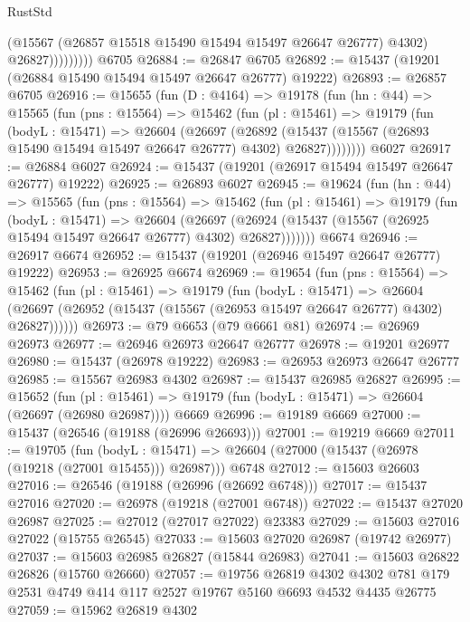 \begin{lexlean}{RustStd}
\begin{coremodule}
                      (@15567 (@26857 @15518 @15490 @15494 @15497 @26647 @26777) @4302)
                      @26827)))))))))
    @6705
@26884 := @26847 @6705
@26892 := @15437 (@19201 (@26884 @15490 @15494 @15497 @26647 @26777) @19222)
@26893 := @26857 @6705
@26916 := @15655
    (fun (D : @4164) =>
    @19178
      (fun (hn : @44) =>
      @15565
        (fun (pns : @15564) =>
        @15462
          (fun (pl : @15461) =>
          @19179
            (fun (bodyL : @15471) =>
            @26604
              (@26697
                (@26892
                  (@15437 (@15567 (@26893 @15490 @15494 @15497 @26647 @26777) @4302) @26827))))))))
    @6027
@26917 := @26884 @6027
@26924 := @15437 (@19201 (@26917 @15494 @15497 @26647 @26777) @19222)
@26925 := @26893 @6027
@26945 := @19624
    (fun (hn : @44) =>
    @15565
      (fun (pns : @15564) =>
      @15462
        (fun (pl : @15461) =>
        @19179
          (fun (bodyL : @15471) =>
          @26604
            (@26697
              (@26924 (@15437 (@15567 (@26925 @15494 @15497 @26647 @26777) @4302) @26827)))))))
    @6674
@26946 := @26917 @6674
@26952 := @15437 (@19201 (@26946 @15497 @26647 @26777) @19222)
@26953 := @26925 @6674
@26969 := @19654
    (fun (pns : @15564) =>
    @15462
      (fun (pl : @15461) =>
      @19179
        (fun (bodyL : @15471) =>
        @26604 (@26697 (@26952 (@15437 (@15567 (@26953 @15497 @26647 @26777) @4302) @26827))))))
@26973 := @79 @6653 (@79 @6661 @81)
@26974 := @26969 @26973
@26977 := @26946 @26973 @26647 @26777
@26978 := @19201 @26977
@26980 := @15437 (@26978 @19222)
@26983 := @26953 @26973 @26647 @26777
@26985 := @15567 @26983 @4302
@26987 := @15437 @26985 @26827
@26995 := @15652
    (fun (pl : @15461) => @19179 (fun (bodyL : @15471) => @26604 (@26697 (@26980 @26987))))
    @6669
@26996 := @19189 @6669
@27000 := @15437 (@26546 (@19188 (@26996 @26693)))
@27001 := @19219 @6669
@27011 := @19705
    (fun (bodyL : @15471) => @26604 (@27000 (@15437 (@26978 (@19218 (@27001 @15455))) @26987)))
    @6748
@27012 := @15603 @26603
@27016 := @26546 (@19188 (@26996 (@26692 @6748)))
@27017 := @15437 @27016
@27020 := @26978 (@19218 (@27001 @6748))
@27022 := @15437 @27020 @26987
@27025 := @27012 (@27017 @27022) @23383
@27029 := @15603 @27016 @27022 (@15755 @26545)
@27033 := @15603 @27020 @26987 (@19742 @26977)
@27037 := @15603 @26985 @26827 (@15844 @26983)
@27041 := @15603 @26822 @26826 (@15760 @26660)
@27057 := @19756
    @26819
    @4302
    @4302
    @781
    @179
    @2531
    @4749
    @414
    @117
    @2527
    @19767
    @5160
    @6693
    @4532
    @4435
    @26775
@27059 := @15962 @26819 @4302

\end{coremodule}
\end{lexlean}
